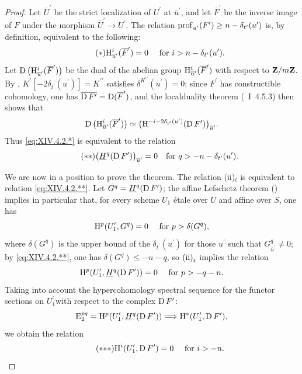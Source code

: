 \begin{proof}
Let $\overline{U}^{\prime}$ be the strict localization of $U^{\prime}$ at $\overline{u}^{\prime}$, and let $\overline{F}^{\prime}$ be the inverse image of $F$ under the morphism $\overline{U}^{\prime}\to U^{\prime}$. The relation $\operatorname{prof}_{u^{\prime}}(F^{\prime})\geq n-\delta_{t^{\prime}}(u^{\prime})$ is, by definition, equivalent to the following:
\begin{equation*} \label{eq:XIV.4.2.*} \tag{$*$} {\mathrm H_{\overline{u}^{\prime}}^{i}(\overline{F}^{\prime})=0\quad\textrm{ for }i>n-\delta_{t^{\prime}}(u^{\prime}).}
\end{equation*}
Let $\operatorname{D}\big(\mathrm H_{\overline{u}^{\prime}}^{i}(\overline{F}^{\prime})\big)$ be the dual of the abelian group $\mathrm H_{\overline{u}^{\prime}}^{i}(\overline{F}^{\prime})$ with respect to $\mathbf Z/m\mathbf Z$. By , $K^{\prime}[-2\delta_{t^{\prime}}(u^{\prime})]=K^{\prime\prime}$ satisfies $\delta^{K^{\prime\prime}}(u^{\prime})=0$; since $F^{\prime}$ has constructible cohomology, one has $\overline{\operatorname{D} F^{\prime}}=\operatorname{D}(\overline{F}^{\prime})$, and the local\pageoriginale duality theorem (~I~4.5.3) then shows that
$$
\operatorname{D}\big(\mathrm H_{\overline{u}^{\prime}}^{i}(\overline{F}^{\prime})\big) \simeq\big(\mathrm H^{-i-2\delta_{t^{\prime}}(u^{\prime})}(\operatorname{D} F^{\prime})\big)_{\overline{u}^{\prime}}.
$$
Thus \eqref{eq:XIV.4.2.*} is equivalent to the relation
\begin{equation*} \label{eq:XIV.4.2.**} \tag{$**$}
\big(\underline{H}^{q}(\operatorname{D} F^{\prime})\big)_{\overline{u}^{\prime}}=0\quad\text{for }q>-n-\delta_{t^{\prime}}(u^{\prime}).
\end{equation*}

We are now in a position to prove the theorem. The relation \textup{(ii)}$_{t}$ is equivalent to relation \eqref{eq:XIV.4.2.**}. Let $G^{q}=\underline{H}^{q}(\operatorname{D} F^{\prime})$; the affine Lefschetz theorem () implies in particular that, for every scheme $U_{1}$ étale over $U$ and affine over $S$, one has
$$
\mathrm H^{p}(U_{1}^{\prime}, G^{q})=0\quad\textrm{ for }p>\delta(G^{q}),
$$
where $\delta(G^{q})$ is the upper bound of the $\delta_{t^{\prime}}(u^{\prime})$ for those $u^{\prime}$ such that $G_{\overline{u}^{\prime}}^{q}\neq 0$; by \eqref{eq:XIV.4.2.**}, one has $\delta(G^{q})\leq -n-q$, so $\textup{(ii)}_{t}$ implies the relation
$$
\mathrm H^{p}(U_{1}^{\prime}, \underline{H}^{q}(\operatorname{D} F^{\prime}))=0\quad\textrm{ for }p>-q-n.
$$
Taking into account the hypercohomology spectral sequence for the functor \og sections on $U_{1}^{\prime}$\fg with respect to the complex $\operatorname{D} F^{\prime}$:
$$
\operatorname{E}_{2}^{pq}=\mathrm H^{p}(U_{1}^{\prime}, \underline{H}^{q}(\operatorname{D} F^{\prime}))\Longrightarrow\mathrm H^{\ast}(U_{1}^{\prime}, \operatorname{D} F^{\prime}),
$$
we obtain the relation
\begin{equation*} \label{eq:XIV.4.2.***} \tag{${*}{*}{*}$}
\H^{i}(U_{1}^{\prime}, \D F^{\prime})=0\quad\textrm{ for }i>-n.
\end{equation*}


\end{proof}
